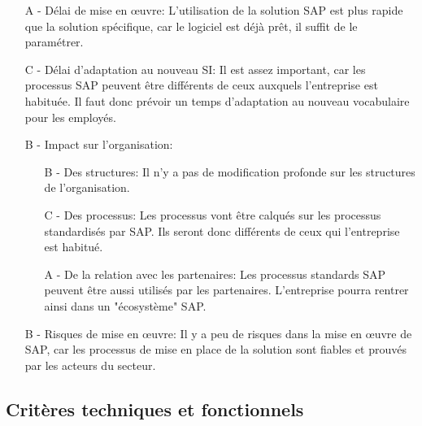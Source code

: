 \begin{itemize}
\item [A -] Délai de mise en \oe{}uvre:\el
	L'utilisation de la solution SAP est plus rapide que la solution
    spécifique, car le logiciel est déjà prêt, il suffit de le paramétrer.

\item [C -] Délai d'adaptation au nouveau SI:\el
	Il est assez important, car les processus SAP peuvent être
    différents de ceux auxquels l'entreprise est habituée. Il faut
    donc prévoir un temps d'adaptation au nouveau vocabulaire pour
    les employés.

\item [B -] Impact sur l'organisation:
    \begin{itemize}
	\item[B -] Des structures:\el
		Il n'y a pas de modification profonde sur les structures
        de l'organisation.
		
	\item[C -] Des processus:\el
		Les processus vont être calqués sur les processus standardisés
        par SAP. Ils seront donc différents de ceux qui l'entreprise
        est habitué.

	\item[A -] De la relation avec les partenaires:\el
		Les processus standards SAP peuvent être aussi utilisés par
        les partenaires. L'entreprise pourra rentrer ainsi dans un "écosystème" SAP.
    \end{itemize}

\item[B -] Risques de mise en \oe{}uvre:\el
	Il y a peu de risques dans la mise en \oe{}uvre de SAP, car les processus
    de mise en place de la solution sont fiables et prouvés par les acteurs
    du secteur. 
\end{itemize}
	

\subsection{Critères techniques et fonctionnels}

